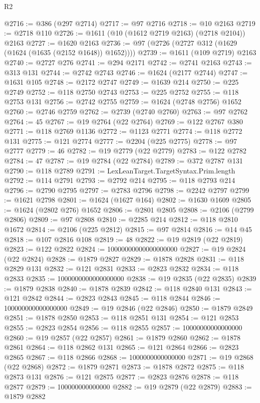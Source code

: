 \begin{lexlean}{R2}
\begin{coremodule}
@2716 := @386 (@297 @2714)
@2717 := @97 @2716
@2718 := @10 @2163
@2719 := @2718 @110
@2726 := @1611 (@10 (@1612 @2719 @2163) (@2718 @2104)) @2163
@2727 := @1620 @2163
@2736 := @97 (@2726 (@2727 @312 (@1629 (@1624 (@1635 (@2152 @1648)) @1652))))
@2739 := @1611 (@109 @2719) @2163
@2740 := @2727 @276
@2741 := @294 @2171
@2742 := @2741 @2163
@2743 := @313 @131
@2744 := @2742 @2743
@2746 := @1624 (@2177 @2744)
@2747 := @1631 @105
@2748 := @2172 @2747
@2749 := @1639 @214
@2750 := @225 @2749
@2752 := @118 @2750 @2743
@2753 := @225 @2752
@2755 := @118 @2753 @131
@2756 := @2742 @2755
@2759 := @1624 (@2748 @2756) @1652
@2760 := @2746 @2759
@2762 := @2739 (@2740 @2760)
@2763 := @97 @2762
@2764 := 45
@2767 := @19 @2764 (@22 @2764)
@2769 := @122 @2767 @380
@2771 := @118 @2769 @1136
@2772 := @1123 @2771
@2774 := @118 @2772 @131
@2775 := @121 @2774
@2777 := @2204 (@225 @2775)
@2778 := @97 @2777
@2779 := 46
@2782 := @19 @2779 (@22 @2779)
@2783 := @122 @2782
@2784 := 47
@2787 := @19 @2784 (@22 @2784)
@2789 := @372 @2787 @131
@2790 := @118 @2789
@2791 := LexLeanTarget.TargetSyntax.Prim.length
@2792 := @114 @2791
@2793 := @2792 @214
@2795 := @118 @2793 @214
@2796 := @2790 @2795
@2797 := @2783 @2796
@2798 := @2242 @2797
@2799 := @1621 @2798
@2801 := @1624 (@1627 @164)
@2802 := @1630 @1609
@2805 := @1624 (@2802 @276) @1652
@2806 := @2801 @2805
@2808 := @2106 (@2799 @2806)
@2809 := @97 @2808
@2810 := @2285 @214
@2812 := @118 @2810 @1672
@2814 := @2106 (@225 @2812)
@2815 := @97 @2814
@2816 := @14 @45
@2818 := @107 @2816 @108
@2819 := 48
@2822 := @19 @2819 (@22 @2819)
@2823 := @122 @2822
@2824 := 10000000000000000000
@2827 := @19 @2824 (@22 @2824)
@2828 := @1879 @2827
@2829 := @1878 @2828
@2831 := @118 @2829 @131
@2832 := @121 @2831
@2833 := @2823 @2832
@2834 := @118 @2833
@2835 := 1000000000000000000
@2838 := @19 @2835 (@22 @2835)
@2839 := @1879 @2838
@2840 := @1878 @2839
@2842 := @118 @2840 @131
@2843 := @121 @2842
@2844 := @2823 @2843
@2845 := @118 @2844
@2846 := 100000000000000000
@2849 := @19 @2846 (@22 @2846)
@2850 := @1879 @2849
@2851 := @1878 @2850
@2853 := @118 @2851 @131
@2854 := @121 @2853
@2855 := @2823 @2854
@2856 := @118 @2855
@2857 := 10000000000000000
@2860 := @19 @2857 (@22 @2857)
@2861 := @1879 @2860
@2862 := @1878 @2861
@2864 := @118 @2862 @131
@2865 := @121 @2864
@2866 := @2823 @2865
@2867 := @118 @2866
@2868 := 1000000000000000
@2871 := @19 @2868 (@22 @2868)
@2872 := @1879 @2871
@2873 := @1878 @2872
@2875 := @118 @2873 @131
@2876 := @121 @2875
@2877 := @2823 @2876
@2878 := @118 @2877
@2879 := 100000000000000
@2882 := @19 @2879 (@22 @2879)
@2883 := @1879 @2882

\end{coremodule}
\end{lexlean}

